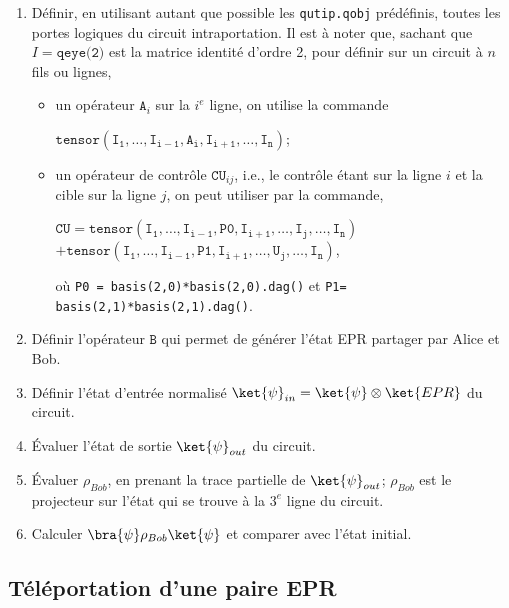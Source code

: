\begin{enumerate}
\item Définir, en utilisant autant que possible les \texttt{qutip.qobj} 
prédéfinis, toutes les portes logiques du circuit intraportation. Il est à 
noter que, sachant que $I=\texttt{qeye(2)}$ est la matrice identité d'ordre 2, 
pour définir sur un circuit à $n$ fils ou lignes,
\begin{itemize}
\item un opérateur $\mathtt{A}_i$ sur la $i^e$ ligne, on utilise la commande 
\begin{center}
$\mathtt{tensor(I_1,\ldots,I_{i-1},A_i,I_{i+1},\ldots,I_n)}$;
\end{center}

\item un opérateur de contrôle $\mathtt{CU}_{ij}$, i.e., le contrôle étant sur 
la ligne $i$ et la cible sur la ligne $j$, on  peut utiliser par la commande, 
\begin{center}
$\mathtt{CU}=\mathtt{tensor(I_1,\ldots,I_{i-1},P0,I_{i+1},\ldots,I_j,\ldots,
I_n)}$\\
$+ \mathtt{tensor(I_1,\ldots,I_{i-1},P1,I_{i+1},\ldots,U_j,\ldots,I_n)}$,
   \end{center}
où \texttt{P0 = basis(2,0)*basis(2,0).dag()} et \texttt{P1= 
basis(2,1)*basis(2,1).dag()}. 
\end{itemize}

\item Définir l'opérateur $\mathtt{B}$ qui permet de générer l'état EPR 
partager 
par Alice et Bob.

\item Définir l'état d'entrée normalisé 
$\ket{\psi}_{in}=\ket{\psi}\otimes\ket{EPR}$ du circuit. 

\item Évaluer l'état de sortie $\ket{\psi}_{out}$ du circuit.

\item Évaluer $\rho_{Bob}$, en prenant la trace partielle de 
$\ket{\psi}_{out}$; $\rho_{Bob}$ est le projecteur sur l'état qui se trouve à 
la $3^e$ ligne du circuit.

\item Calculer $\bra{\psi}\rho_{Bob}\ket{\psi}$ et comparer avec l'état 
initial.

\end{enumerate}


\subsection{Téléportation d'une paire EPR}\label{CircuiEPR}


